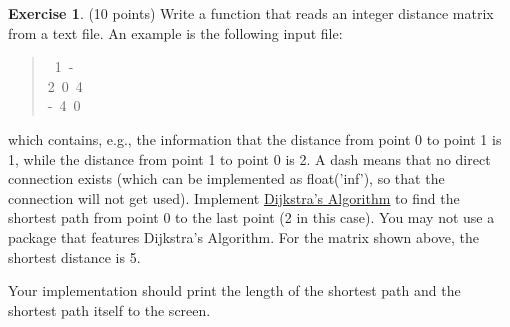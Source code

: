 \documentclass[a4paper]{report}
\theoremstyle{definition}
\newtheorem{exercise}{Exercise}
\begin{document}
\begin{exercise}
	(10 points) Write a function that reads an integer distance matrix from a text file. An example is the following input file:
	\begin{quote}{\ttfamily \raggedright {}~1~-\\
			2~0~4\\
			-~4~0
		}
	\end{quote}

	\noindent which contains, e.g., the information that the distance from point 0 to point 1 is 1, while the distance from point 1 to point 0 is 2. A dash means that no direct connection exists (which can be implemented as float('inf'), so that the connection will not get used). Implement \href{https://en.wikipedia.org/wiki/Dijkstra's_algorithm\#Pseudocode}{Dijkstra’s Algorithm} to find the shortest path from point 0 to the last point (2 in this case). You may not use a package that features Dijkstra’s Algorithm. For the matrix shown above, the shortest distance is 5.

	Your implementation should print the length of the shortest path and the shortest path itself to the screen.
\end{exercise}
\end{document}
